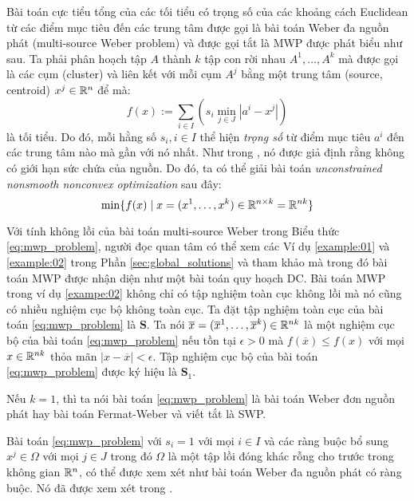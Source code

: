 \documentclass[a4paper]{report}
\begin{document}
    Bài toán cực tiểu tổng của các tối tiểu có trọng số của các khoảng cách Euclidean từ các điểm mục tiêu đến các trung tâm được gọi là bài toán Weber đa nguồn phát (multi-source Weber problem) và được gọi tắt là MWP được phát biểu như sau. Ta phải phân hoạch tập $A$ thành $k$ tập con rời nhau $A^1, \dots, A^k$ mà được gọi là các cụm (cluster) và liên kết với mỗi cụm $A^j$ bằng một trung tâm (source, centroid) $x^j \in \mathbb{R}^n$ để mà:
    \begin{equation}
        \label{eq:mwp_objective_function}
        f(x):= \sum_{i \in I}\left(s_i \min_{j \in J}\left|a^i - x^j\right|\right)
    \end{equation}
    là tối tiểu. Do đó, mỗi hằng số $s_i, i \in I$ thể hiện \emph{trọng số} từ điểm mục tiêu $a^i$ đến các trung tâm nào mà gần với nó nhất. Như trong \cite[trang 333]{cooper1963location}, nó được giả định rằng không có giới hạn sức chứa của nguồn. Do đó, ta có thể giải bài toán \emph{unconstrained nonsmooth nonconvex optimization} sau đây:
    \begin{equation}
        \label{eq:mwp_problem}
        \min\{f(x) \mid x = (x^1, \dots, x^k) \in \mathbb{R}^{n \times k} = \mathbb{R}^{nk}\}
    \end{equation}

    Với tính không lồi của bài toán multi-source Weber trong Biểu thức \eqref{eq:mwp_problem}, người đọc quan tâm có thể xem các Ví dụ \ref{example:01} và \ref{example:02} trong Phần \ref{sec:global_solutions} và tham khảo \cite{tuy1998convex, thy2001clustering} mà trong đó bài toán MWP được nhận diện như một bài toán quy hoạch DC. Bài toán MWP trong ví dụ \ref{exampe:02} không chỉ có tập nghiệm toàn cục không lồi mà nó cũng có nhiều nghiệm cục bộ không toàn cục. Ta đặt tập nghiệm toàn cục của bài toán \eqref{eq:mwp_problem} là $\mathbf{S}$. Ta nói $\overline{x} = (\overline{x}^1, \dots, \overline{x}^k) \in \mathbb{R}^{nk}$ là một nghiệm cục bộ của bài toán \eqref{eq:mwp_problem} nếu tồn tại $\epsilon > 0$ mà $f(\overline{x}) \leq f(x)$ với mọi $x \in \mathbb{R}^{nk}$ thỏa mãn $\left| x - \overline{x}\right| < \epsilon$. Tập nghiệm cục bộ của bài toán \eqref{eq:mwp_problem} được ký hiệu là $\mathbf{S}_1$.

    Nếu $k = 1$, thì ta nói bài toán \eqref{eq:mwp_problem} là bài toán Weber đơn nguồn phát hay bài toán Fermat-Weber và viết tắt là SWP.

    \begin{remark}
        Bài toán \eqref{eq:mwp_problem} với $s_i = 1$ với mọi $i \in I$ và các ràng buộc bổ sung $x^j \in \Omega$ với mọi $j \in J$ trong đó $\Omega$ là một tập lồi đóng khác rỗng cho trước trong không gian $\mathbb{R}^n$, có thể được xem xét như bài toán Weber đa nguồn phát có ràng buộc. Nó đã được xem xét trong \cite[trạng 222-226]{tuy1998convex}.
    \end{remark}
    
\end{document}
